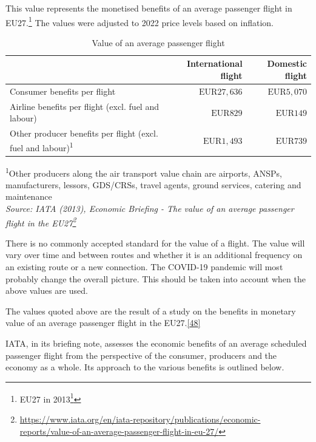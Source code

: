 \documentclass[
  11pt,
  a4paper,
]{book}
\DeclareRobustCommand{\href}[2]{#2\footnote{\url{#1}}}
\begin{document}
This value represents the monetised benefits of an average passenger
flight in EU27.\footnote{\href{https://ec.europa.eu/eurostat/statistics-explained/index.php/Glossary:EU_enlargements}{EU27
  in 2013}} The values were adjusted to 2022 price levels based on
inflation.

\hypertarget{tbl-value-passenger-flight}{}
\setlength{\LTpost}{0mm}
\begin{longtable}{lrr}
\caption{\label{tbl-value-passenger-flight}Value of an average passenger flight }\tabularnewline

\toprule
  & International flight & Domestic flight \\ 
\midrule
Consumer benefits per flight & $\text{EUR}27,636$ & $\text{EUR}5,070$ \\ 
Airline benefits per flight (excl. fuel and labour) & $\text{EUR}829$ & $\text{EUR}149$ \\ 
Other producer benefits per flight (excl. fuel and labour)\textsuperscript{1} & $\text{EUR}1,493$ & $\text{EUR}739$ \\ 
\bottomrule
\end{longtable}
\begin{minipage}{\linewidth}
\textsuperscript{1}Other producers along the air transport value chain are airports, ANSPs, manufacturers, lessors, GDS/CRSs, travel agents, ground services, catering and maintenance\\
\emph{Source: \href{https://www.iata.org/en/iata-repository/publications/economic-reports/value-of-an-average-passenger-flight-in-eu-27/}{IATA (2013), Economic Briefing - The value of an average passenger flight in the EU27}}\\
\end{minipage}

There is no commonly accepted standard for the value of a flight. The
value will vary over time and between routes and whether it is an
additional frequency on an existing route or a new connection. The
COVID-19 pandemic will most probably change the overall picture. This
should be taken into account when the above values are used.

The values quoted above are the result of a study on the benefits in
monetary value of an average passenger flight in the
EU27.\protect\hyperlink{ref-IATAEconomicBriefing}{{[}48{]}}

IATA, in its briefing note, assesses the economic benefits of an average
scheduled passenger flight from the perspective of the consumer,
producers and the economy as a whole. Its approach to the various
benefits is outlined below.
\end{document}
